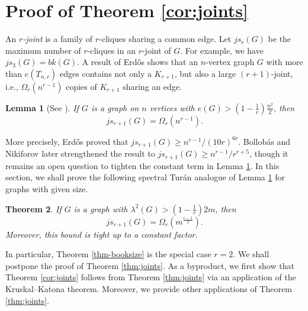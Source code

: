 \documentclass[11pt,a4paper]{article}
\newtheorem{theorem}{Theorem}[section]
\newtheorem{lemma}[theorem]{Lemma}
\theoremstyle{definition}
\theoremstyle{remark}
\begin{document}
\section{Proof of Theorem \ref{cor:joints}}

\label{sec-3}



An \emph{$r$-joint} is a family of $r$-cliques sharing a common edge. Let $js_r(G)$ be the maximum number of $r$-cliques in an $r$-joint of $G$. For example, we have $js_3(G) = bk(G)$. 
A result of Erd\H{o}s \cite{Erd1969} 
shows that an $n$-vertex graph $G$ with more than 
$e(T_{n,r})$ edges contains not only a $K_{r+1}$, 
but also a large $(r+1)$-joint, i.e., 
$\Omega_r(n^{r-1})$ copies of $K_{r+1}$ sharing an edge. 

\begin{lemma}[See \cite{Erd1969,BN2008}] 
\label{thm-Erd-joint}
    If $G$ is a graph on $n$ vertices with $e(G) > (1 - \frac{1}{r}) \frac{n^2}{2}$, then 
    \[ js_{r+1}(G) = \Omega_r(n^{r - 1}). \] 
\end{lemma}
More precisely, Erd\H{o}s \cite{Erd1969} proved that 
$js_{r+1}(G) \ge n^{r-1}/(10r)^{6r} $.
Bollob\'{a}s and Nikiforov \cite{BN2008} later strengthened the result to $js_{r+1}(G) \ge n^{r-1}/ r^{r+5}$, though it remains an open question to tighten the constant term in Lemma \ref{thm-Erd-joint}. 
In this section, we shall prove the following spectral Tur\'{a}n analogue of Lemma \ref{thm-Erd-joint} for graphs with given size. 

\begin{theorem} \label{thm-jsr+1}
    \label{thm:joints}
    If $G$ is a graph with $\lambda^2(G) > (1 - \frac{1}{r}) 2m$, then 
    \[ js_{r + 1}(G) =
    \Omega_r(m^{\frac{r - 1}{2}}). \] 
    Moreover, this bound is tight up to a constant factor. 
\end{theorem}

In particular, Theorem \ref{thm-booksize} is the special case $r = 2$.  
We shall postpone the proof of Theorem \ref{thm:joints}. 
As a byproduct, we first show that 
Theorem \ref{cor:joints} follows from Theorem \ref{thm:joints}  via an application of the Kruskal--Katona theorem. Moreover, we provide other  applications of 
Theorem \ref{thm:joints}. 
\end{document}
